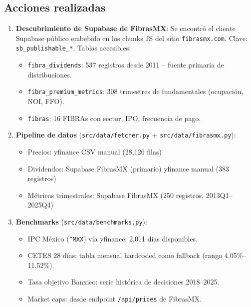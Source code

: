 \documentclass[12pt, a4paper]{article}
\begin{document}
\subsection{Acciones realizadas}

\begin{enumerate}

  \item \textbf{Descubrimiento de Supabase de FibrasMX}: Se encontr\'{o} el cliente Supabase p\'{u}blico
        embebido en los chunks JS del sitio \texttt{fibrasmx.com}. Clave: \texttt{sb\_publishable\_*}.
        Tablas accesibles:
        \begin{itemize}
          \item \texttt{fibra\_dividends}: 537 registros desde 2011 -- fuente primaria de distribuciones.
          \item \texttt{fibra\_premium\_metrics}: 308 trimestres de fundamentales (ocupaci\'{o}n, NOI, FFO).
          \item \texttt{fibras}: 16 FIBRAs con sector, IPO, frecuencia de pago.
        \end{itemize}

  \item \textbf{Pipeline de datos} (\texttt{src/data/fetcher.py} + \texttt{src/data/fibrasmx.py}):
        \begin{itemize}
          \item Precios: yfinance \textrightarrow{} CSV manual (28{,}126 filas)
          \item Dividendos: Supabase FibrasMX (primario) \textrightarrow{} yfinance \textrightarrow{} manual (383 registros)
          \item M\'{e}tricas trimestrales: Supabase FibrasMX (250 registros, 2013Q1--2025Q4)
        \end{itemize}

  \item \textbf{Benchmarks} (\texttt{src/data/benchmarks.py}):
        \begin{itemize}
          \item IPC M\'{e}xico (\texttt{\^{}MXX}) v\'{i}a yfinance: 2{,}011 d\'{i}as disponibles.
          \item CETES 28 d\'{i}as: tabla mensual hardcoded como fallback (rango 4.05\%--11.52\%).
          \item Tasa objetivo Banxico: serie hist\'{o}rica de decisiones 2018--2025.
          \item Market caps: desde endpoint \texttt{/api/prices} de FibrasMX.
        \end{itemize}


\end{enumerate}
\end{document}
